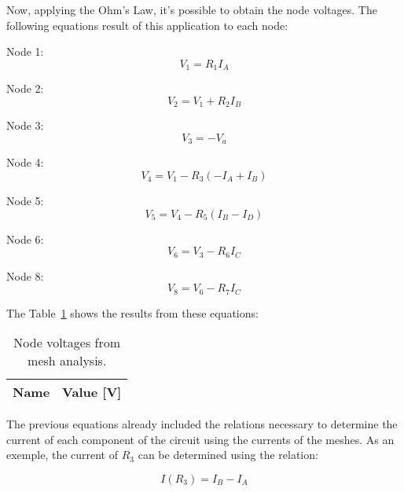 Now, applying the Ohm's Law, it's possible to obtain the node voltages. The following equations result of this application to each node: \vspace{4mm}

Node 1:
\begin{equation}
  V_1 = R_1I_A
  \label{eq:V1}
\end{equation}

Node 2:
\begin{equation}
  V_2 = V_1+R_2I_B
  \label{eq:V2}
\end{equation}

Node 3:
\begin{equation}
  V_3 = -V_a
  \label{eq:V3}
\end{equation}

Node 4:
\begin{equation}
  V_4 = V_1 - R_3(-I_A+I_B)
  \label{eq:V4}
\end{equation}

Node 5:
\begin{equation}
  V_5 = V_4 - R_5(I_B-I_D)
  \label{eq:V5}
\end{equation}

Node 6:
\begin{equation}
  V_6 = V_3 - R_6I_C
  \label{eq:V6}
\end{equation}

Node 8:
\begin{equation}
  V_8 = V_6 - R_7I_C
  \label{eq:V8}
\end{equation}

The Table~\ref{tab:meshV} shows the results from these equations:

\begin{table}[h]
  \centering
  \begin{tabular}{|l|r|}
    \hline    
    {\bf Name} & {\bf Value [V]} \\ \hline
    
  \end{tabular}
  \caption{Node voltages from mesh analysis.}
  \label{tab:meshV}
\end{table}

The previous equations already included the relations necessary to determine the current of each component of the circuit using the currents of the meshes. As an exemple, the current of $R_3$ can be determined using the relation:

\begin{equation}
  I(R_3) = I_B - I_A
  \label{eq:IR3}
\end{equation}

